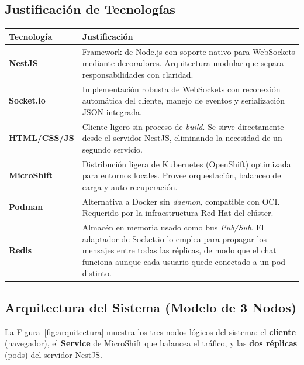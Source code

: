 \documentclass[11pt,a4paper]{article}
\begin{document}
\subsection{Justificación de Tecnologías}
\renewcommand{\arraystretch}{1.4}
\begin{tabularx}{\linewidth}{>{\bfseries}l X}
\toprule
Tecnología & Justificación \\
\midrule
NestJS & Framework de Node.js con soporte nativo para WebSockets mediante
decoradores. Arquitectura modular que separa responsabilidades con claridad. \\
Socket.io & Implementación robusta de WebSockets con reconexión automática del
cliente, manejo de eventos y serialización JSON integrada. \\
HTML/CSS/JS & Cliente ligero sin proceso de \emph{build}. Se sirve directamente
desde el servidor NestJS, eliminando la necesidad de un segundo servicio. \\
MicroShift & Distribución ligera de Kubernetes (OpenShift) optimizada para
entornos locales. Provee orquestación, balanceo de carga y auto-recuperación. \\
Podman & Alternativa a Docker sin \emph{daemon}, compatible con OCI. Requerido
por la infraestructura Red Hat del clúster. \\
Redis & Almacén en memoria usado como bus \emph{Pub/Sub}. El adaptador de
Socket.io lo emplea para propagar los mensajes entre todas las réplicas, de modo
que el chat funciona aunque cada usuario quede conectado a un pod distinto. \\
\bottomrule
\end{tabularx}

\subsection{Arquitectura del Sistema (Modelo de 3 Nodos)}
La Figura~\ref{fig:arquitectura} muestra los tres nodos lógicos del sistema: el
\textbf{cliente} (navegador), el \textbf{Service} de MicroShift que balancea el
tráfico, y las \textbf{dos réplicas} (pods) del servidor NestJS.
\end{document}
